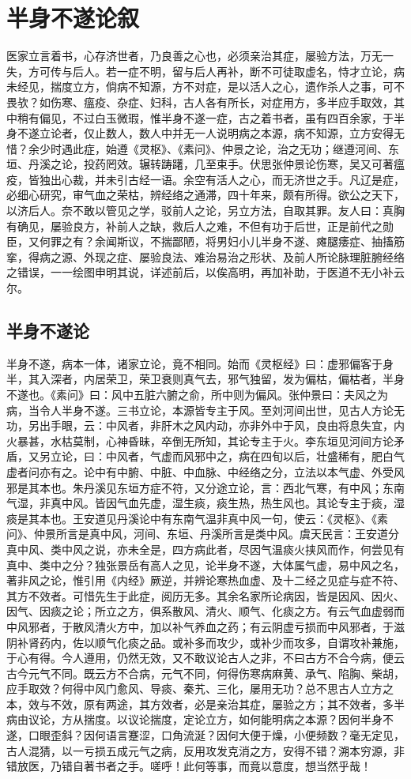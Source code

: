 \documentclass[a4paper,12pt,UTF8,twoside]{ctexbook}
\begin{document}
	\chapter{半身不遂论叙}
	医家立言着书，心存济世者，乃良善之心也，必须亲治其症，屡验方法，万无一失，方可传与后人。若一症不明，留与后人再补，断不可徒取虚名，恃才立论，病未经见，揣度立方，倘病不知源，方不对症，是以活人之心，遗作杀人之事，可不畏欤？如伤寒、瘟疫、杂症、妇科，古人各有所长，对症用方，多半应手取效，其中稍有偏见，不过白玉微瑕，惟半身不遂一症，古之着书者，虽有四百余家，于半身不遂立论者，仅止数人，数人中并无一人说明病之本源，病不知源，立方安得无惜？余少时遇此症，始遵《灵枢》、《素问》、仲景之论，治之无功；继遵河间、东垣、丹溪之论，投药罔效。辗转踌躇，几至束手。伏思张仲景论伤寒，吴又可著瘟疫，皆独出心裁，并未引古经一语。余空有活人之心，而无济世之手。凡辽是症，必细心研究，审气血之荣枯，辨经络之通滞，四十年来，颇有所得。欲公之天下，以济后人。奈不敢以管见之学，驳前人之论，另立方法，自取其罪。友人曰：真胸有确见，屡验良方，补前人之缺，救后人之难，不但有功于后世，正是前代之勋臣，又何罪之有？余闻斯议，不揣鄙陋，将男妇小儿半身不遂、瘫腿痿症、抽搐筋挛，得病之源、外现之症、屡验良法、难治易治之形状、及前人所论脉理脏腑经络之错误，一一绘图申明其说，详述前后，以俟高明，再加补助，于医道不无小补云尔。
	\section{半身不遂论}
	半身不遂，病本一体，诸家立论，竟不相同。始而《灵枢经》曰：虚邪偏客于身半，其入深者，内居荣卫，荣卫衰则真气去，邪气独留，发为偏枯，偏枯者，半身不遂也。《素问》曰：风中五脏六腑之俞，所中则为偏风。张仲景曰：夫风之为病，当令人半身不遂。三书立论，本源皆专主于风。至刘河间出世，见古人方论无功，另出手眼，云：中风者，非肝木之风内动，亦非外中于风，良由将息失宜，内火暴甚，水枯莫制，心神昏昧，卒倒无所知，其论专主于火。李东垣见河间方论矛盾，又另立论，曰：中风者，气虚而风邪中之，病在四旬以后，壮盛稀有，肥白气虚者问亦有之。论中有中腑、中脏、中血脉、中经络之分，立法以本气虚、外受风邪是其本也。朱丹溪见东垣方症不符，又分途立论，言：西北气寒，有中风；东南气湿，非真中风。皆因气血先虚，湿生痰，痰生热，热生风也。其论专主于痰，湿痰是其本也。王安道见丹溪论中有东南气温非真中风一句，使云：《灵枢》、《素问》、仲景所言是真中风，河间、东垣、丹溪所言是类中风。虞天民言：王安道分真中风、类中风之说，亦未全是，四方病此者，尽因气温痰火挟风而作，何尝见有真中、类中之分？独张景岳有高人之见，论半身不遂，大体属气虚，易中风之名，著非风之论，惟引用《内经》厥逆，并辨论寒热血虚、及十二经之见症与症不符、其方不效者。可惜先生于此症，阅历无多。其余名家所论病因，皆是因风、因火、因气、因痰之论；所立之方，俱系散风、清火、顺气、化痰之方。有云气血虚弱而中风邪者，于散风清火方中，加以补气养血之药；有云阴虚亏损而中风邪者，于滋阴补肾药内，佐以顺气化痰之品。或补多而攻少，或补少而攻多，自谓攻补兼施，于心有得。今人遵用，仍然无效，又不敢议论古人之非，不曰古方不合今病，便云古今元气不同。既云方不合病，元气不同，何得伤寒病麻黄、承气、陷胸、柴胡，应手取效？何得中风门愈风、导痰、秦艽、三化，屡用无功？总不思古人立方之本，效与不效，原有两途，其方效者，必是亲治其症，屡验之方；其不效者，多半病由议论，方从揣度。以议论揣度，定论立方，如何能明病之本源？因何半身不遂，口眼歪斜？因何语言蹇涩，口角流涎？因何大便于燥，小便频数？毫无定见，古人混猜，以一亏损五成元气之病，反用攻发克消之方，安得不错？溯本穷源，非错放医，乃错自著书者之手。嗟呼！此何等事，而竟以意度，想当然乎哉！
\end{document}
